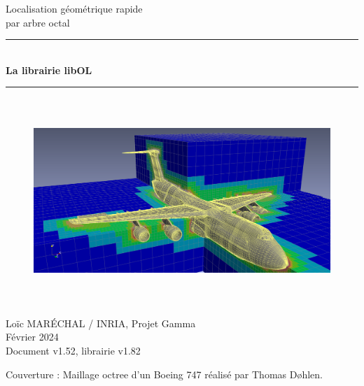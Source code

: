 \documentclass[a4paper,12pt]{article}
\newcommand{\HRule}{\rule{\linewidth}{1mm}}
\begin{document}
%
%

\begin{titlepage}

\begin{center}
\huge Localisation géométrique rapide \\ par arbre octal
\HRule \\
\medskip
{\Huge \bfseries La librairie libOL} \\
\HRule
\end{center}


\begin{figure}[htbp]
\begin{center}
\includegraphics[height=7.8cm]{octree_mesh.png}
\end{center}
\end{figure}


\begin{flushright}
\Large Lo\"ic MAR\'ECHAL / INRIA, Projet Gamma\\
\Large Février 2024 \\
\normalsize Document v1.52, librairie v1.82
\end{flushright}

\end{titlepage}

\clearpage

\setcounter{tocdepth}{2}
\tableofcontents
\vfill

\footnotesize{Couverture : Maillage octree d'un Boeing 747 réalisé par Thomas Døhlen.}
\normalsize

\clearpage


%
%
\end{document}
